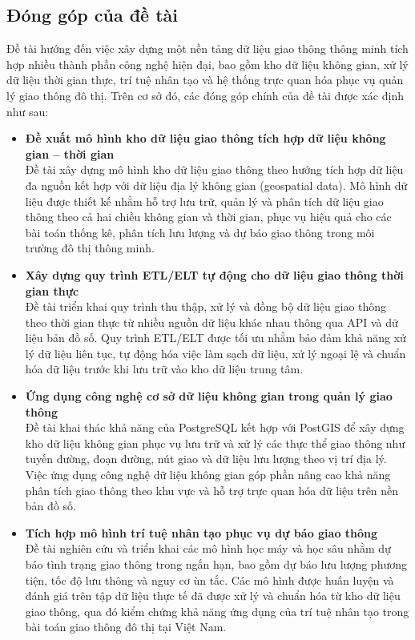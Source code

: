 \subsection{Đóng góp của đề tài}

Đề tài hướng đến việc xây dựng một nền tảng dữ liệu giao thông thông minh tích hợp nhiều thành phần công nghệ hiện đại, bao gồm kho dữ liệu không gian, xử lý dữ liệu thời gian thực, trí tuệ nhân tạo và hệ thống trực quan hóa phục vụ quản lý giao thông đô thị. Trên cơ sở đó, các đóng góp chính của đề tài được xác định như sau:

\begin{itemize}

    \item \textbf{Đề xuất mô hình kho dữ liệu giao thông tích hợp dữ liệu không gian – thời gian}\\
    Đề tài xây dựng mô hình kho dữ liệu giao thông theo hướng tích hợp dữ liệu đa nguồn kết hợp với dữ liệu địa lý không gian (geospatial data). Mô hình dữ liệu được thiết kế nhằm hỗ trợ lưu trữ, quản lý và phân tích dữ liệu giao thông theo cả hai chiều không gian và thời gian, phục vụ hiệu quả cho các bài toán thống kê, phân tích lưu lượng và dự báo giao thông trong môi trường đô thị thông minh.

    \item \textbf{Xây dựng quy trình ETL/ELT tự động cho dữ liệu giao thông thời gian thực}\\
    Đề tài triển khai quy trình thu thập, xử lý và đồng bộ dữ liệu giao thông theo thời gian thực từ nhiều nguồn dữ liệu khác nhau thông qua API và dữ liệu bản đồ số. Quy trình ETL/ELT được tối ưu nhằm bảo đảm khả năng xử lý dữ liệu liên tục, tự động hóa việc làm sạch dữ liệu, xử lý ngoại lệ và chuẩn hóa dữ liệu trước khi lưu trữ vào kho dữ liệu trung tâm.

    \item \textbf{Ứng dụng công nghệ cơ sở dữ liệu không gian trong quản lý giao thông}\\
    Đề tài khai thác khả năng của PostgreSQL kết hợp với PostGIS để xây dựng kho dữ liệu không gian phục vụ lưu trữ và xử lý các thực thể giao thông như tuyến đường, đoạn đường, nút giao và dữ liệu lưu lượng theo vị trí địa lý. Việc ứng dụng công nghệ dữ liệu không gian góp phần nâng cao khả năng phân tích giao thông theo khu vực và hỗ trợ trực quan hóa dữ liệu trên nền bản đồ số.

    \item \textbf{Tích hợp mô hình trí tuệ nhân tạo phục vụ dự báo giao thông}\\
    Đề tài nghiên cứu và triển khai các mô hình học máy và học sâu nhằm dự báo tình trạng giao thông trong ngắn hạn, bao gồm dự báo lưu lượng phương tiện, tốc độ lưu thông và nguy cơ ùn tắc. Các mô hình được huấn luyện và đánh giá trên tập dữ liệu thực tế đã được xử lý và chuẩn hóa từ kho dữ liệu giao thông, qua đó kiểm chứng khả năng ứng dụng của trí tuệ nhân tạo trong bài toán giao thông đô thị tại Việt Nam.


\end{itemize}
